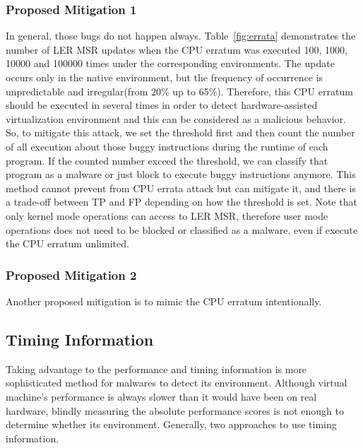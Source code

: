 \subsubsection{Proposed Mitigation 1}
In general, those bugs do not happen always. Table~\ref{fig:errata} demonstrates the number of LER MSR updates when the CPU erratum was executed 100, 1000, 10000 and 100000 times under the corresponding environments. The update occurs only in the native environment, but the frequency of occurrence is unpredictable and irregular(from 20\% up to 65\%). Therefore, this CPU erratum should be executed in several times in order to detect hardware-assisted virtualization environment and this can be considered as a malicious behavior. So, to mitigate this attack, we set the threshold first and then count the number of all execution about those buggy instructions during the runtime of each program. If the counted number exceed the threshold, we can classify that program as a malware or just block to execute buggy instructions anymore. This method cannot prevent from CPU errata attack but can mitigate it, and there is a trade-off between TP and FP depending on how the threshold is set. Note that only kernel mode operations can access to LER MSR, therefore user mode operations does not need to be blocked or classified as a malware, even if execute the CPU erratum unlimited.

\subsubsection{Proposed Mitigation 2}
Another proposed mitigation is to mimic the CPU erratum intentionally. 

\subsection{Timing Information}
\label{sec:approach-timing}
Taking advantage to the performance and timing information is more sophisticated method for malwares to detect its environment. Although virtual machine’s performance is always slower than it would have been on real hardware, blindly measuring the absolute performance scores is not enough to determine whether its environment. Generally, two approaches to use timing information.



